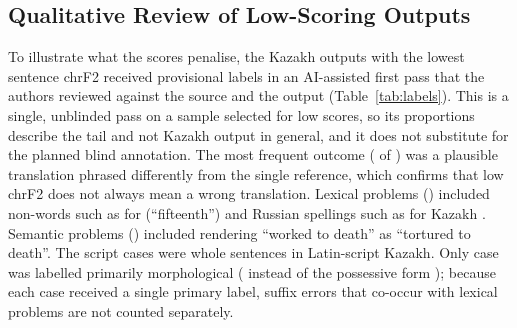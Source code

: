 \begin{table}[!t]
\centering
\caption{QA Accuracy on \NQa{} Paired Belebele Questions With Exact 95\% Intervals, Discordant Pairs and Exact McNemar $p$-Values}
\label{tab:qa}
\footnotesize
\resizebox{\columnwidth}{!}{}
\end{table}

\subsection{Qualitative Review of Low-Scoring Outputs}
To illustrate what the scores penalise, the \NReviewed{} Kazakh outputs with the lowest sentence chrF2 received provisional labels in an AI-assisted first pass that the authors reviewed against the source and the output (Table~\ref{tab:labels}). This is a single, unblinded pass on a sample selected for low scores, so its proportions describe the tail and not Kazakh output in general, and it does not substitute for the planned blind annotation. The most frequent outcome (\LabReferenceMismatch{} of \NReviewed) was a plausible translation phrased differently from the single reference, which confirms that low chrF2 does not always mean a wrong translation. Lexical problems (\LabLexical) included non-words such as  for  (``fifteenth'') and Russian spellings such as  for Kazakh . Semantic problems (\LabSemantic) included rendering ``worked to death'' as ``tortured to death''. The \LabScript{} script cases were whole sentences in Latin-script Kazakh. Only \LabMorphological{} case was labelled primarily morphological ( instead of the possessive form ); because each case received a single primary label, suffix errors that co-occur with lexical problems are not counted separately.

\begin{table}[!t]
\centering
\caption{First-Pass Labels of the \NReviewed{} Lowest-chrF2 EN$\rightarrow$KK Outputs (Provisional AI-Assisted Pass Reviewed by the Authors; Blind Double Annotation Pending)}
\label{tab:labels}
\footnotesize

\end{table}
